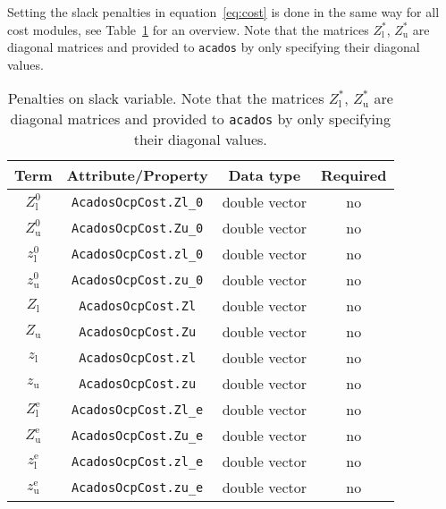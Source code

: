 \documentclass[english]{article}
\newcommand{\code}[1]{\texttt{#1}}
\newcommand{\acados}{\texttt{acados}}
\newcommand{\ind}[1]{_{\textrm{#1}}}
\newcommand{\terminal}{^{\textrm{e}}}
\newcommand{\initial}{^{\textrm{0}}}
\newcommand{\Lower}{\ind{l}}
\newcommand{\upper}{\ind{u}}
\newcommand{\optional}{no}
\begin{document}
Setting the slack penalties in equation~\eqref{eq:cost} is done in the same way for all cost modules, see Table~\ref{tab:cost:slack} for an overview.
Note that the matrices $Z\Lower^*$, $Z\upper^*$ are diagonal matrices and provided to \acados{} by only specifying their diagonal values.

%
\begin{table}[h!]
    \centering
    \begin{tabular}{cccc}
        \toprule
        Term  & Attribute/Property & Data type & Required \\ \midrule
        $ Z\Lower\initial $ & \code{AcadosOcpCost.Zl\_0} & double vector & \optional   \\[3pt]
        $ Z\upper\initial $ & \code{AcadosOcpCost.Zu\_0} & double vector & \optional   \\[3pt]
        $ z\Lower\initial $ & \code{AcadosOcpCost.zl\_0} & double vector  & \optional   \\[3pt]
        $ z\upper\initial $ & \code{AcadosOcpCost.zu\_0} & double vector  & \optional   \\[10pt]
        $ Z\Lower $          & \code{AcadosOcpCost.Zl}    & double vector  & \optional \\[3pt]
        $ Z\upper $          & \code{AcadosOcpCost.Zu}    & double vector  & \optional   \\[3pt]
        $ z\Lower $          & \code{AcadosOcpCost.zl}    & double vector  & \optional   \\[3pt]
        $ z\upper $          & \code{AcadosOcpCost.zu}    & double vector  & \optional   \\[10pt]
        $ Z\Lower\terminal $ & \code{AcadosOcpCost.Zl\_e} & double vector & \optional   \\[3pt]
        $ Z\upper\terminal $ & \code{AcadosOcpCost.Zu\_e} & double vector & \optional   \\[3pt]
        $ z\Lower\terminal $ & \code{AcadosOcpCost.zl\_e} & double vector  & \optional   \\[3pt]
        $ z\upper\terminal $ & \code{AcadosOcpCost.zu\_e} & double vector  & \optional   \\[3pt]
        \bottomrule
    \end{tabular}
    \caption{Penalties on slack variable.
    Note that the matrices $Z\Lower^*$, $Z\upper^*$ are diagonal matrices and provided to \acados{} by only specifying their diagonal values.} \label{tab:cost:slack}
\end{table}
\end{document}

